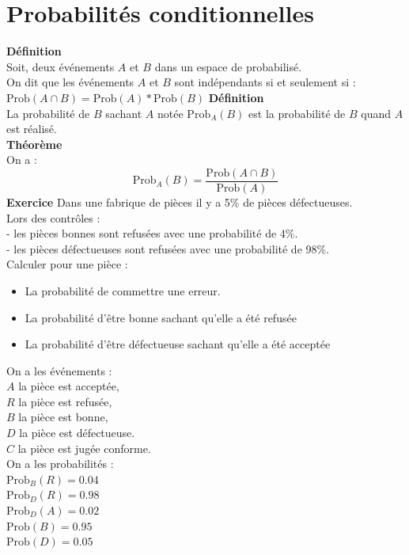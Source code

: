 \documentclass[a4paper,11pt]{book}
\begin{document}
\section{Probabilit\'es conditionnelles}
{\bf D\'efinition}\\
Soit, deux \'ev\'enements $A$ et $B$ dans un espace de probabilis\'e.\\
On dit que les \'ev\'enements $A$ et $B$ sont ind\'ependants si et seulement 
si :\\
$\mbox{Prob}(A\cap B)=\mbox{Prob}(A)*\mbox{Prob}(B)$
{\bf D\'efinition}\\
La probabilit\'e de $B$ sachant $A$ not\'ee $\mbox{Prob}_A(B)$ est la 
probabilit\'e de $B$ quand $A$ est r\'ealis\'e.\\
{\bf Th\'eor\`eme}\\
On a :
$$\mbox{Prob}_A(B)=\frac{\mbox{Prob}(A\cap B)}{\mbox{Prob}(A)}$$
{\bf Exercice}
Dans une fabrique de pi\`eces il y a 5\% de pi\`eces d\'efectueuses.\\
Lors des contr\^oles :\\
- les pi\`eces bonnes sont refus\'ees avec une probabilit\'e de 4\%.\\
- les pi\`eces d\'efectueuses sont refus\'ees avec une probabilit\'e de 98\%.\\
Calculer pour une pi\`ece :
\begin{itemize}
\item La probabilit\'e de commettre une erreur.
\item La probabilit\'e d'\^etre bonne sachant qu'elle a \'et\'e refus\'ee
\item La probabilit\'e d'\^etre d\'efectueuse sachant qu'elle a \'et\'e 
accept\'ee
\end{itemize}
On a les \'ev\'enements :\\
$A$ la pi\`ece est accept\'ee,\\
$R$ la pi\`ece est refus\'ee,\\
$B$ la pi\`ece est bonne,\\
$D$ la pi\`ece est d\'efectueuse.\\
$C$ la pi\`ece est jug\'ee conforme.\\
On a les probabilit\'es :\\
$\mbox{Prob}_B(R)=0.04$\\
$\mbox{Prob}_D(R)=0.98$\\
$\mbox{Prob}_D(A)=0.02$\\
$\mbox{Prob}(B)=0.95$\\
$\mbox{Prob}(D)=0.05$\\
\end{document}
